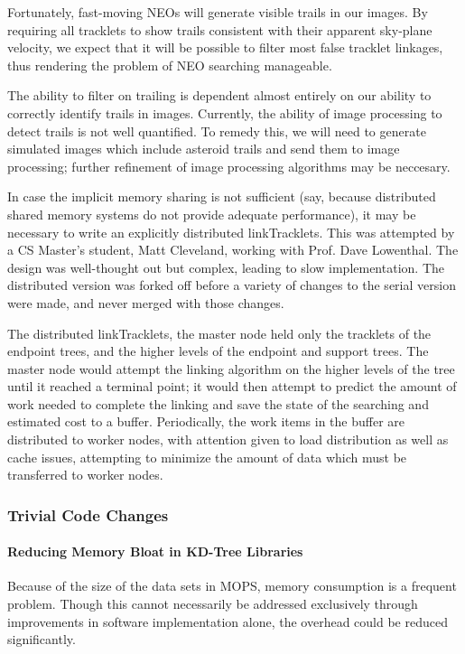 Fortunately, fast-moving NEOs will generate visible trails in our
images.  By requiring all tracklets to show trails consistent with
their apparent sky-plane velocity, we expect that it will be possible
to filter most false tracklet linkages, thus rendering the problem of
NEO searching manageable.

The ability to filter on trailing is dependent almost entirely on our
ability to correctly identify trails in images.  Currently, the
ability of image processing to detect trails is not well quantified.  To
remedy this, we will need to generate simulated images which include
asteroid trails and send them to image processing; further refinement
of image processing algorithms may be neccesary.



In case the implicit memory sharing is not sufficient (say, because
distributed shared memory systems do not provide adequate
performance), it may be necessary to write an explicitly distributed
linkTracklets.  This was attempted by a CS Master's student, Matt
Cleveland, working with Prof. Dave Lowenthal.  The design was
well-thought out but complex, leading to slow implementation.  The
distributed version was forked off before a variety of changes to the
serial version were made, and never merged with those changes.

The distributed linkTracklets, the master node held only the tracklets
of the endpoint trees, and the higher levels of the endpoint and
support trees.  The master node would attempt the linking algorithm on
the higher levels of the tree until it reached a terminal point; it
would then attempt to predict the amount of work needed to complete
the linking and save the state of the searching and estimated cost to
a buffer.  Periodically, the work items in the buffer are distributed
to worker nodes, with attention given to load distribution as well as
cache issues, attempting to minimize the amount of data which must be
transferred to worker nodes.


\subsubsection{Trivial Code Changes}
\paragraph{Reducing Memory Bloat in KD-Tree Libraries}

Because of the size of the data sets in MOPS, memory consumption is a
frequent problem.  Though this cannot necessarily be addressed
exclusively through improvements in software implementation alone, the
overhead could be reduced significantly.

